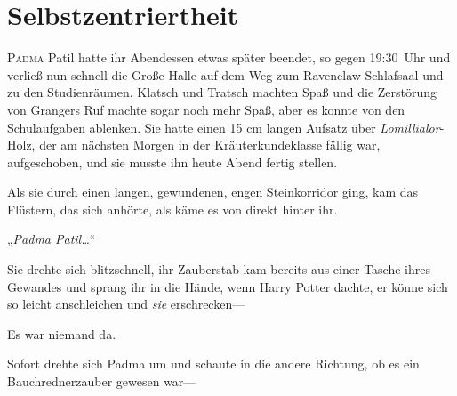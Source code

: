 \chapter{Selbstzentriertheit}

\lettrine{P}{adma} Patil hatte ihr Abendessen etwas später beendet, so gegen 19:30~Uhr und verließ nun schnell die Große Halle auf dem Weg zum Ravenclaw-Schlafsaal und zu den Studienräumen. Klatsch und Tratsch machten Spaß und die Zerstörung von Grangers Ruf machte sogar noch mehr Spaß, aber es konnte von den Schulaufgaben ablenken. Sie hatte einen 15 cm langen Aufsatz über \emph{Lomillialor}-Holz, der am nächsten Morgen in der Kräuterkundeklasse fällig war, aufgeschoben, und sie musste ihn heute Abend fertig stellen.

Als sie durch einen langen, gewundenen, engen Steinkorridor ging, kam das Flüstern, das sich anhörte, als käme es von direkt hinter ihr.

„\emph{Padma Patil…}“

Sie drehte sich blitzschnell, ihr Zauberstab kam bereits aus einer Tasche ihres Gewandes und sprang ihr in die Hände, wenn Harry Potter dachte, er könne sich so leicht anschleichen und \emph{sie} erschrecken—

Es war niemand da.

Sofort drehte sich Padma um und schaute in die andere Richtung, ob es ein Bauchrednerzauber gewesen war—

